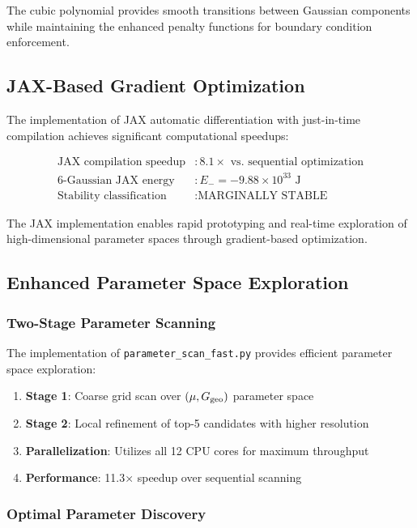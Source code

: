 \documentclass[11pt]{article}
\begin{document}
The cubic polynomial provides smooth transitions between Gaussian components while maintaining the enhanced penalty functions for boundary condition enforcement.

\subsection{JAX-Based Gradient Optimization}

The implementation of JAX automatic differentiation with just-in-time compilation achieves significant computational speedups:

\begin{align}
\text{JAX compilation speedup} &: 8.1 \times \text{ vs. sequential optimization} \\
\text{6-Gaussian JAX energy} &: E_- = -9.88 \times 10^{33} \text{ J} \\
\text{Stability classification} &: \text{MARGINALLY STABLE}
\end{align}

The JAX implementation enables rapid prototyping and real-time exploration of high-dimensional parameter spaces through gradient-based optimization.

\subsection{Enhanced Parameter Space Exploration}

\subsubsection{Two-Stage Parameter Scanning}

The implementation of \texttt{parameter\_scan\_fast.py} provides efficient parameter space exploration:

\begin{enumerate}
\item \textbf{Stage 1}: Coarse grid scan over $(\mu, G_{\rm geo})$ parameter space
\item \textbf{Stage 2}: Local refinement of top-5 candidates with higher resolution
\item \textbf{Parallelization}: Utilizes all 12 CPU cores for maximum throughput
\item \textbf{Performance}: 11.3× speedup over sequential scanning
\end{enumerate}

\subsubsection{Optimal Parameter Discovery}
\end{document}
